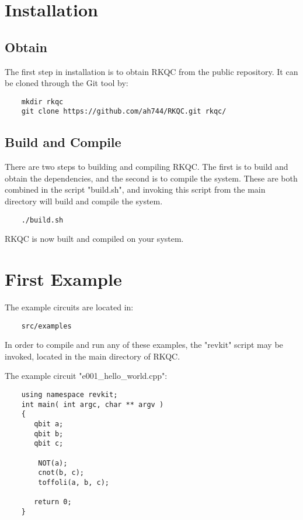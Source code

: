 \section{Installation}

\subsection{Obtain}

The first step in installation is to obtain RKQC from the public repository. It can be cloned through the Git tool by:
\begin{lstlisting}
    mkdir rkqc 
    git clone https://github.com/ah744/RKQC.git rkqc/
\end{lstlisting}

\subsection{Build and Compile}

There are two steps to building and compiling RKQC. The first is to build and obtain the dependencies, and the second is to compile the system. These are both combined in the script "build.sh", and invoking this script from the main directory will build and compile the system. 

\begin{lstlisting}
    ./build.sh
\end{lstlisting}

RKQC is now built and compiled on your system.


\section{First Example}

The example circuits are located in: 
\begin{lstlisting} 
    src/examples 
\end{lstlisting}

In order to compile and run any of these examples, the "revkit" script may be invoked, located in the main directory of RKQC. 

The example circuit "e001\_hello\_world.cpp": 

\begin{lstlisting}
	using namespace revkit;
	int main( int argc, char ** argv )
	{
	   qbit a;
	   qbit b;
	   qbit c;
	
		NOT(a);
		cnot(b, c);
		toffoli(a, b, c);
	
	   return 0;
	}

\end{lstlisting}


